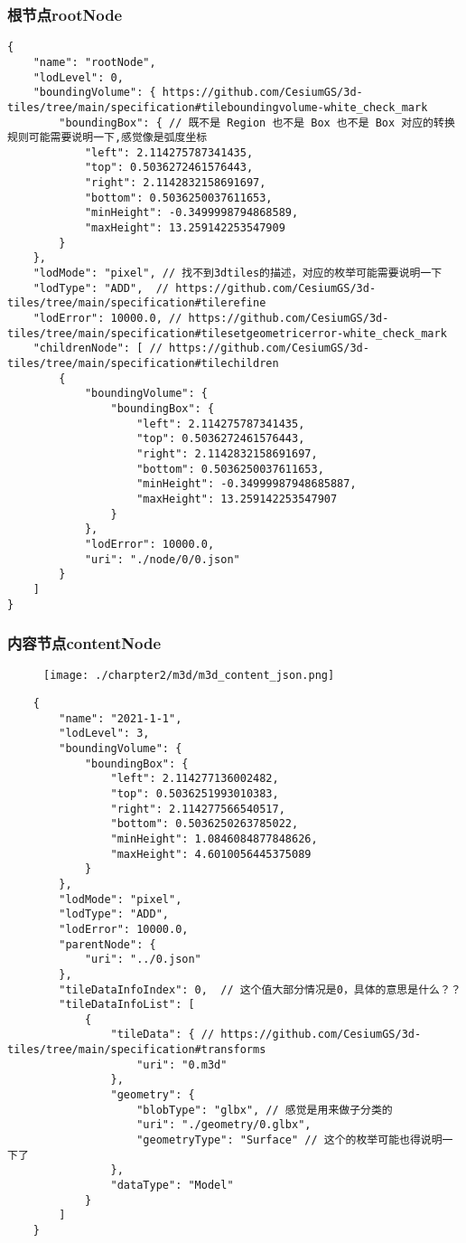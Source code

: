 \subsubsection{根节点rootNode}
\begin{lstlisting}
{
    "name": "rootNode",
    "lodLevel": 0,
    "boundingVolume": { https://github.com/CesiumGS/3d-tiles/tree/main/specification#tileboundingvolume-white_check_mark
        "boundingBox": { // 既不是 Region 也不是 Box 也不是 Box 对应的转换规则可能需要说明一下,感觉像是弧度坐标
            "left": 2.114275787341435,
            "top": 0.5036272461576443,
            "right": 2.1142832158691697,
            "bottom": 0.5036250037611653,
            "minHeight": -0.3499998794868589,
            "maxHeight": 13.259142253547909
        }
    },
    "lodMode": "pixel", // 找不到3dtiles的描述，对应的枚举可能需要说明一下
    "lodType": "ADD",  // https://github.com/CesiumGS/3d-tiles/tree/main/specification#tilerefine
    "lodError": 10000.0, // https://github.com/CesiumGS/3d-tiles/tree/main/specification#tilesetgeometricerror-white_check_mark
    "childrenNode": [ // https://github.com/CesiumGS/3d-tiles/tree/main/specification#tilechildren
        {
            "boundingVolume": {
                "boundingBox": {
                    "left": 2.114275787341435,
                    "top": 0.5036272461576443,
                    "right": 2.1142832158691697,
                    "bottom": 0.5036250037611653,
                    "minHeight": -0.34999987948685887,
                    "maxHeight": 13.259142253547907
                }
            },
            "lodError": 10000.0,
            "uri": "./node/0/0.json"
        }
    ]
}
\end{lstlisting}

\subsubsection{内容节点contentNode}
\begin{figure}[!htb]
    \centering
    \texttt{[image: ./charpter2/m3d/m3d\_content\_json.png]}
  \end{figure}
\begin{lstlisting}
	{
		"name": "2021-1-1",
		"lodLevel": 3,
		"boundingVolume": {
			"boundingBox": {
				"left": 2.114277136002482,
				"top": 0.5036251993010383,
				"right": 2.114277566540517,
				"bottom": 0.5036250263785022,
				"minHeight": 1.0846084877848626,
				"maxHeight": 4.6010056445375089
			}
		},
		"lodMode": "pixel",
		"lodType": "ADD",
		"lodError": 10000.0,
		"parentNode": {
			"uri": "../0.json"
		},
		"tileDataInfoIndex": 0,  // 这个值大部分情况是0，具体的意思是什么？？
		"tileDataInfoList": [
			{
				"tileData": { // https://github.com/CesiumGS/3d-tiles/tree/main/specification#transforms
					"uri": "0.m3d"
				},
				"geometry": {
					"blobType": "glbx", // 感觉是用来做子分类的
					"uri": "./geometry/0.glbx",
					"geometryType": "Surface" // 这个的枚举可能也得说明一下了
				},
				"dataType": "Model" 
			}
		]
	}
\end{lstlisting}

